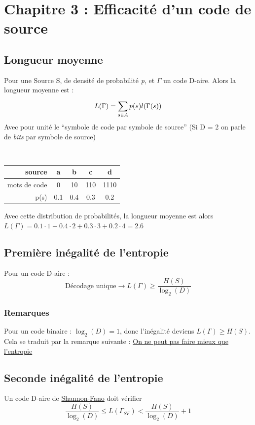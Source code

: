 \documentclass[11pt,a4paper]{article}
\begin{document}
\section[Efficacité d'un Code de Source]{Chapitre 3 : Efficacité d'un code de source}
\subsection{Longueur moyenne}
Pour une Source S, de densité de probabilité \textit{p}, et $\Gamma$ un code D-aire. Alors la longueur moyenne est :
\begin{equation}
	L(\Gamma) = \sum\limits_{s\in A}^{}p(s)l(\Gamma(s))
\end{equation}
Avec pour unité le \enquote{symbole de code par symbole de source} (Si D = 2 on parle de \textit{bits} par symbole de source)\\
\begin{exemple}~
	\begin{multicols}{2}
		\begin{tabular}{r|c|c|c|c}
			source & a&b&c&d\\
			\hline
			mots de code & 0 & 10 & 110 & 1110\\
			\hline
			p(s) & 0.1 & 0.4 & 0.3 & 0.2 
		\end{tabular} 
		\columnbreak
			
		Avec cette distribution de probabilités, la longueur moyenne est alors \\$L(\Gamma) = 0.1\cdot 1 + 0.4\cdot 2 + 0.3 \cdot 3 + 0.2 \cdot 4 = 2.6$
	\end{multicols}
\end{exemple}

\subsection{Première inégalité de l'entropie}
\label{premiere inegalite entropie}
Pour un code D-aire :
\begin{equation}
	\text{Décodage unique} \to L(\Gamma)\geq \frac{H(S)}{\log_2(D)}
\end{equation}
\subsubsection{Remarques}
Pour un code binaire : $\log_2(D) = 1$, donc l'inégalité deviens $L(\Gamma) \geq H(S)$. Cela se traduit par la remarque suivante  : \uline{On ne peut pas faire mieux que l'entropie}

\subsection{Seconde inégalité de l'entropie}
\label{seconde inegalite entropie}
Un code D-aire de \hyperref[shannon]{Shannon-Fano} doit vérifier 
\begin{equation}
	\frac{H(S)}{\log_2(D)} \leq L(\Gamma_{SF}) < \frac{H(S)}{\log_2(D)}+1	
\end{equation}
\end{document}
